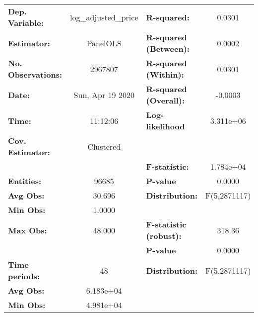 \documentclass{report}
\begin{document}
\begin{center}
\begin{tabular}{lclc}
\toprule
\textbf{Dep. Variable:}                          & log\_adjusted\_price & \textbf{  R-squared:         }   &      0.0301      \\
\textbf{Estimator:}                              &       PanelOLS       & \textbf{  R-squared (Between):}  &      0.0002      \\
\textbf{No. Observations:}                       &       2967807        & \textbf{  R-squared (Within):}   &      0.0301      \\
\textbf{Date:}                                   &   Sun, Apr 19 2020   & \textbf{  R-squared (Overall):}  &     -0.0003      \\
\textbf{Time:}                                   &       11:12:06       & \textbf{  Log-likelihood     }   &    3.311e+06     \\
\textbf{Cov. Estimator:}                         &      Clustered       & \textbf{                     }   &                  \\
\textbf{}                                        &                      & \textbf{  F-statistic:       }   &    1.784e+04     \\
\textbf{Entities:}                               &        96685         & \textbf{  P-value            }   &      0.0000      \\
\textbf{Avg Obs:}                                &        30.696        & \textbf{  Distribution:      }   &   F(5,2871117)   \\
\textbf{Min Obs:}                                &        1.0000        & \textbf{                     }   &                  \\
\textbf{Max Obs:}                                &        48.000        & \textbf{  F-statistic (robust):} &      318.36      \\
\textbf{}                                        &                      & \textbf{  P-value            }   &      0.0000      \\
\textbf{Time periods:}                           &          48          & \textbf{  Distribution:      }   &   F(5,2871117)   \\
\textbf{Avg Obs:}                                &      6.183e+04       & \textbf{                     }   &                  \\
\textbf{Min Obs:}                                &      4.981e+04       & \textbf{                     }   &                  \\

\end{tabular}
\end{center}
\end{document}
